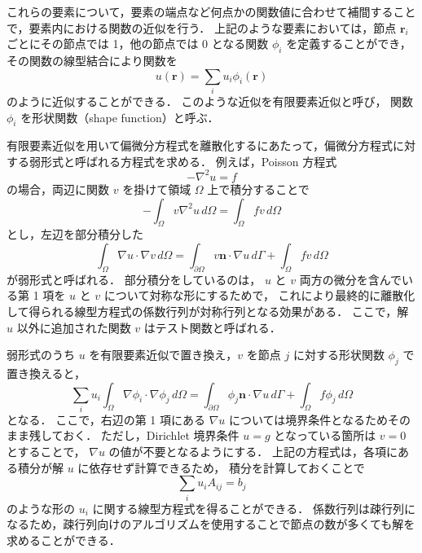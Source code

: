 これらの要素について，要素の端点など何点かの関数値に合わせて補間することで，要素内における関数の近似を行う．
上記のような要素においては，節点 $\bm{r}_i$ ごとにその節点では 1，他の節点では 0 となる関数 $\phi_i$ を定義することができ，
その関数の線型結合により関数を
\begin{equation}
    u(\bm{r}) = \sum_i u_i \phi_i(\bm{r})
\end{equation}
のように近似することができる．
このような近似を有限要素近似と呼び，
関数 $\phi_i$ を形状関数（shape function）と呼ぶ．

有限要素近似を用いて偏微分方程式を離散化するにあたって，偏微分方程式に対する弱形式と呼ばれる方程式を求める．
例えば，Poisson 方程式
\begin{equation}
    -\nabla^2 u = f
\end{equation}
の場合，両辺に関数 $v$ を掛けて領域 $\Omega$ 上で積分することで
\begin{equation}
    -\int_{\Omega} v \nabla^2 u \, d\Omega = \int_{\Omega} f v \, d\Omega
\end{equation}
とし，左辺を部分積分した
\begin{equation}
    \int_{\Omega} \nabla u \cdot \nabla v \, d\Omega
    = \int_{\partial \Omega} v \bm{n} \cdot \nabla u \, d\Gamma
    + \int_{\Omega} f v \, d\Omega
\end{equation}
が弱形式と呼ばれる．
部分積分をしているのは，
$u$ と $v$ 両方の微分を含んでいる第 1 項を $u$ と $v$ について対称な形にするためで，
これにより最終的に離散化して得られる線型方程式の係数行列が対称行列となる効果がある．
ここで，解 $u$ 以外に追加された関数 $v$ はテスト関数と呼ばれる．

弱形式のうち $u$ を有限要素近似で置き換え，$v$ を節点 $j$ に対する形状関数 $\phi_j$ で置き換えると，
\begin{equation}
    \sum_i u_i \int_{\Omega} \nabla \phi_i \cdot \nabla \phi_j \, d\Omega
    = \int_{\partial \Omega} \phi_j \bm{n} \cdot \nabla u \, d\Gamma
    + \int_{\Omega} f \phi_j \, d\Omega
\end{equation}
となる．
ここで，右辺の第 1 項にある $\nabla u$ については境界条件となるためそのまま残しておく．
ただし，Dirichlet 境界条件 $u = g$ となっている箇所は $v = 0$ とすることで，
$\nabla u$ の値が不要となるようにする．
上記の方程式は，各項にある積分が解 $u$ に依存せず計算できるため，
積分を計算しておくことで
\begin{equation}
    \sum_i u_i A_{ij} = b_j
\end{equation}
のような形の $u_i$ に関する線型方程式を得ることができる．
係数行列は疎行列になるため，疎行列向けのアルゴリズムを使用することで節点の数が多くても解を求めることができる．
